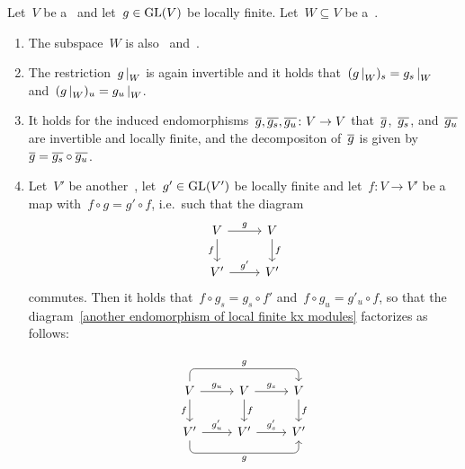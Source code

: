 \begin{lemma}
  \label{properties of local mjcd}
  Let~$V$ be a~{\kvs} and let~$g \in \operatorname{GL}(V)$ be locally finite.
  Let~$W \subseteq V$ be a~.
  \begin{enumerate}
    \item
      The subspace~$W$ is also~ and~.
    \item
      \label{restriction of local mjcd}
      The restriction~$\restrict{g}{W}$ is again invertible and it holds that~$(\restrict{g}{W})_s = \restrict{g_s}{W}$ and~$(\restrict{g}{W})_u = \restrict{g_u}{W}$.
    \item
      \label{induced local mjcd}
      It holds for the induced endomorphisms~$\overline{g}, \overline{g_s}, \overline{g_u} \colon V \to V$ that~$\overline{g}$,~$\overline{g_s}$, and~$\overline{g_u}$ are invertible and locally finite, and the {\JCD} decompositon of~$\overline{g}$ is given by~$\overline{g} = \overline{g_s} \circ \overline{g_u}$.
    \item
      Let~$V'$ be another~{\kvs}, let~$g' \in \operatorname{GL}(V')$ be locally finite and let~$f \colon V \to V'$ be a~ map with~$f \circ g = g' \circ f$, i.e.\ such that the diagram
      \begin{equation}
        \label{another endomorphism of local finite kx modules}
        \begin{tikzcd}
            V
            \arrow{r}[above]{g}
            \arrow{d}[left]{f}
          & V
            \arrow{d}[right]{f}
          \\
            V'
            \arrow{r}[above]{g'}
          & V'
        \end{tikzcd}
      \end{equation}
      commutes.
      Then it holds that~$f \circ g_s = g_s \circ f'$ and~$f \circ g_u = g'_u \circ f$, so that the diagram~\eqref{another endomorphism of local finite kx modules} factorizes as follows:
      \[
        \begin{tikzcd}
            {}
          & {}
          & {}
          \\
            V
            \arrow[rounded corners,
              to path = { -- ([yshift=1em] \tikztostart.north)
                          -- ([yshift=1em] \tikztotarget.north) \tikztonodes
                          -- (\tikztotarget)
                        }
            ]{rr}[above]{g}
            \arrow{r}[above]{g_u}
            \arrow{d}[left]{f}
          & V
            \arrow{r}[above]{g_s}
            \arrow{d}[right]{f}
          & V
            \arrow{d}[right]{f}
          \\
            V'
            \arrow{r}[above]{g'_u}
            \arrow[rounded corners,
              to path = { -- ([yshift=-1em] \tikztostart.south)
                          -- ([yshift=-1em] \tikztotarget.south) \tikztonodes
                          -- (\tikztotarget)
                        }
            ]{rr}[below]{g}
          & V'
            \arrow{r}[above]{g'_s}
          & V'
        \end{tikzcd}
      \]
  \end{enumerate}
\end{lemma}


